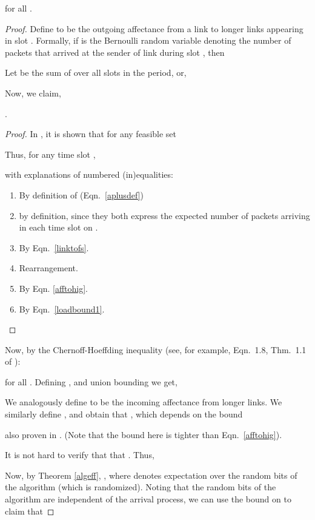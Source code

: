 \documentclass[11pt]{amsart}
\begin{document}
\begin{lemma}
\label{schednumberbound1}
  for all .
\end{lemma}
\begin{proof}
Define  to be the outgoing affectance from a link  to longer links appearing in slot . Formally, if  is the Bernoulli random variable denoting the number of packets that arrived at the sender of link  during slot , then

Let  be the sum of  over all  slots in the period, or,

Now, we claim,
\begin{claim}
.
\label{expectedA}
\end{claim}
\begin{proof}
In \cite{KV10}, it is shown that for any feasible set 



Thus, for any time slot ,

 with explanations of numbered (in)equalities:
\begin{enumerate}
\item By definition of  (Eqn.~\ref{aplusdef})
\item  by definition, since they both express the expected number of packets arriving in each time slot on .
\item By Eqn.~\ref{linktofs}.
\item Rearrangement.
\item By Eqn. \ref{afftohig}.
\item By Eqn.~\ref{loadbound1}.
\end{enumerate}
\end{proof}


Now, by the Chernoff-Hoeffding inequality (see, for example, Eqn.~1.8, Thm.~1.1 of \cite{dubhashi}):

for all . Defining , and union bounding we get,



\noindent We analogously define 
 to be the incoming affectance from longer links. We similarly define , and obtain that
,
which depends on the bound

also proven in \cite{KV10}. (Note that the bound here is
tighter than Eqn.~\ref{afftohig}).


It is not hard to verify that that
. Thus,



Now, by Theorem \ref{algeff}, , where  denotes expectation over the random bits of the algorithm (which is randomized).  Noting that the random bits of the algorithm are independent of the arrival process, we can use the bound on 
to claim that 


\end{proof}
\end{document}
